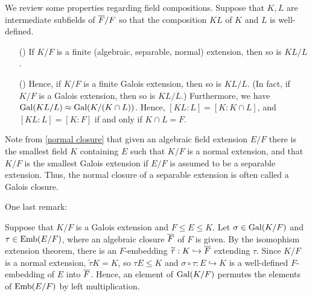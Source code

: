 \begin{obs}
    We review some properties regarding field compositions.
    Suppose that $K, L$ are intermediate subfields of $\overline{F}/F$ so that the composition $KL$ of $K$ and $L$ is well-defined.
    \begin{enumerate}
        \item[(\romannumeral 1)]
        {
            If $K/F$ is a finite (algebraic, separable, normal) extension, then so is $KL/L$.
        }
        \item[(\romannumeral 2)]
        {
            Hence, if $K/F$ is a finite Galois extension, then so is $KL/L$.
            (In fact, if $K/F$ is a Galois extension, then so is $KL/L$.)
            Furthermore, we have ${\textrm{Gal}({KL/L})}\approx{\textrm{Gal}({K/(K\cap L)})}$.
            Hence, $[KL:L]=[K:K\cap L]$, and $[KL:L]=[K:F]$ if and only if $K\cap L=F$.
        }
    \end{enumerate}
\end{obs}

Note from \cref{normal closure} that given an algebraic field extension $E/F$ there is the smallest field $K$ containing $E$ such that $K/F$ is a normal extension, and that $K/F$ is the smallest Galois extension if $E/F$ is assumed to be a separable extension.
Thus, the normal closure of a separable extension is often called a Galois closure.

One last remark:
\begin{rmk}
    Suppose that $K/F$ is a Galois extension and $F\leq E\leq K$.
    Let $\sigma\in{\textrm{Gal}({K/F})}$ and $\tau\in{\textrm{Emb}({E/F})}$, where an algebraic closure $\overline{F}$ of $F$ is given.
    By the isomophism extension theorem, there is an $F$-embedding $\widetilde\tau: K\hookrightarrow\overline{F}$ extending $\tau$.
    Since $K/F$ is a normal extension, $\widetilde\tau K=K$, so $\tau E\leq K$ and $\sigma\circ\tau: E\hookrightarrow K$ is a well-defined $F$-embedding of $E$ into $\overline{F}$.
    Hence, an element of ${\textrm{Gal}({K/F})}$ permutes the elements of ${\textrm{Emb}({E/F})}$ by left multiplication.
\end{rmk}